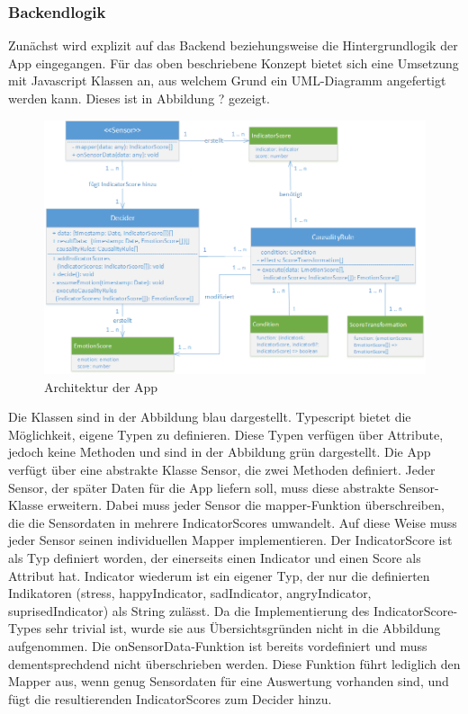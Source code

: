 \subsubsection{Backendlogik}
Zunächst wird explizit auf das Backend beziehungsweise die Hintergrundlogik der App eingegangen. Für das oben beschriebene Konzept bietet sich eine Umsetzung mit Javascript Klassen an, aus welchem Grund ein UML-Diagramm angefertigt werden kann. Dieses ist in Abbildung ? gezeigt. \newline
\begin{figure}[h]
	\centering
	\includegraphics[width=16cm]{Bilder/architecture.png}
	\caption[Architektur der App]{Architektur der App}
\end{figure}%
\newline
Die Klassen sind in der Abbildung blau dargestellt. Typescript bietet die Möglichkeit, eigene Typen zu definieren. Diese Typen verfügen über Attribute, jedoch keine Methoden und sind in der Abbildung grün dargestellt. \newline 
Die App verfügt über eine abstrakte Klasse Sensor, die zwei Methoden definiert. Jeder Sensor, der später Daten für die App liefern soll, muss diese abstrakte Sensor-Klasse erweitern. Dabei muss jeder Sensor die mapper-Funktion überschreiben, die die Sensordaten in mehrere IndicatorScores umwandelt. Auf diese Weise muss jeder Sensor seinen individuellen Mapper implementieren. Der IndicatorScore ist als Typ definiert worden, der einerseits einen Indicator und einen Score als Attribut hat. Indicator wiederum ist ein eigener Typ, der nur die definierten Indikatoren (stress, happyIndicator, sadIndicator, angryIndicator, suprisedIndicator) als String zulässt. Da die Implementierung des IndicatorScore-Types sehr trivial ist, wurde sie aus Übersichtsgründen nicht in die Abbildung aufgenommen. Die onSensorData-Funktion ist bereits vordefiniert und muss dementsprechdend nicht überschrieben werden. Diese Funktion führt lediglich den Mapper aus, wenn genug Sensordaten für eine Auswertung vorhanden sind, und fügt die resultierenden IndicatorScores zum Decider hinzu. \newline \newline
